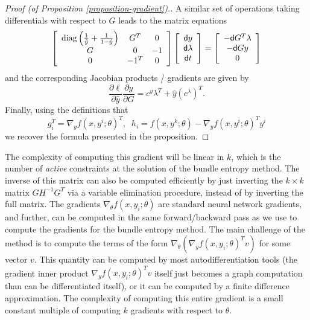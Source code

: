 \begin{proof}[Proof (of Proposition \ref{proposition-gradient}).]
A similar set of operations taking differentials with respect to $G$ leads to
the matrix equations
{\small
\begin{equation}
\left [ \begin{array}{ccc}
\operatorname*{diag}\left(\frac{1}{\hat y} + \frac{1}{1-\hat y}\right) & G^T & 0 \\
G & 0 & -1 \\
0 & -1^T & 0 \end{array} \right ]
\left [ \begin{array}{c} \mathsf{d} y \\ \mathsf{d} \lambda \\ \mathsf{d} t \end{array} \right ]
= \left [ \begin{array}{c} -\mathsf{d} G^T \lambda \\ - \mathsf{d} G y \\ 0 \end{array}
\right ]
\end{equation}
}
and the corresponding Jacobian products / gradients are given by
\begin{equation}
\frac{\partial \ell}{\partial \hat{y}} \frac{\partial \hat{y}}{\partial
G} = c^y \lambda^T + \hat{y} (c^\lambda)^T.
\end{equation}
Finally, using the definitions that
\begin{equation}
g_i^T = \nabla_y f (x, y^i;\theta)^T,\;\;  h_i = f(x, y^k;\theta) -
\nabla_y f(x,y^i;\theta)^T y^i
\end{equation}
we recover the formula presented in the proposition.
\end{proof}



The complexity of computing this gradient will be linear in $k$, which is the
number of \emph{active} constraints at the solution of the bundle entropy
method.  The inverse of this matrix can also be computed efficiently by just
inverting the $k
\times k$ matrix $G H^{-1} G^T$ via
a variable elimination procedure, instead of by inverting the full matrix.
The gradients $\nabla_\theta f(x,y_i;\theta)$ are standard neural network
gradients, and further, can be computed in the same forward/backward pass as we
use to compute the gradients for the bundle entropy method.
The main challenge of the method is to compute the terms of the form
$\nabla_\theta (\nabla_y f(x,y_i;\theta)^T v)$
for some vector $v$.  This quantity can be computed by most autodifferentiation
tools (the gradient inner product $\nabla_y f(x,y_i;\theta)^T v$ itself just
becomes a graph computation than can be differentiated itself), or it can be
computed by a finite difference approximation.
The complexity of computing this entire gradient is a small
constant multiple of computing $k$ gradients with respect to $\theta$.

